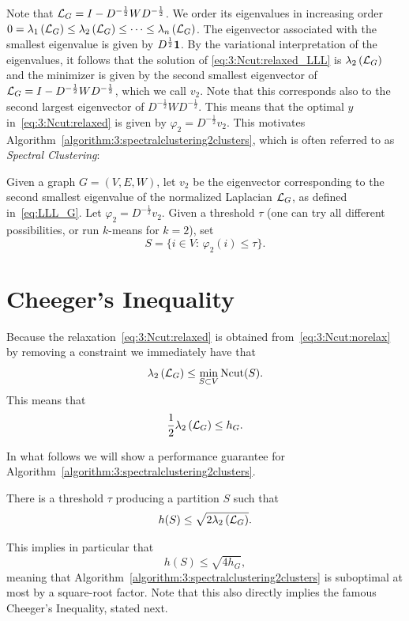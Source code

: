 Note that $\mathcal{L}_G = I - D^{-\frac12}WD^{-\frac12}$. We order its eigenvalues in increasing order $0=\lambda_1\left( \mathcal{L}_G\right) \leq \lambda_2\left( \mathcal{L}_G\right) \leq \cdots \leq  \lambda_n\left( \mathcal{L}_G\right)$. The eigenvector associated with the smallest eigenvalue is given by $D^{\frac12}\mathbf{1}$. By the variational interpretation of the eigenvalues, it follows that the solution of \eqref{eq:3:Ncut:relaxed_LLL} is $\lambda_2\left( \mathcal{L}_G\right)$ and the minimizer is given by the second smallest eigenvector of $\mathcal{L}_G = I - D^{-\frac12}WD^{-\frac12}$, which we call $v_2$. Note that this corresponds also to the second largest eigenvector of $D^{-\frac12}WD^{-\frac12}$. This means that the optimal $y$ in~\eqref{eq:3:Ncut:relaxed} is given by $\varphi_2 = D^{-\frac12}v_2$. This motivates Algorithm~\ref{algorithm:3:spectralclustering2clusters}, which is often referred to as {\em Spectral Clustering}:
\begin{algorithm}[h]
Given a graph $G=(V,E,W)$, let $v_2$ be the eigenvector corresponding to the second smallest eigenvalue of the normalized Laplacian $\mathcal{L}_G$, as defined in~\eqref{eq:LLL_G}. Let $\varphi_2 = D^{-\frac12}v_2$.
Given a threshold $\tau$ (one can try all different possibilities, or run $k$-means for $k=2$), set
\[
S = \{ i\in V:\, \varphi_2(i)\leq \tau \}.
\]
\caption{Spectral Clustering}
\label{algorithm:3:spectralclustering2clusters}
\end{algorithm}



\section{Cheeger's Inequality} 
Because the relaxation~\eqref{eq:3:Ncut:relaxed} is obtained from~\eqref{eq:3:Ncut:norelax} by removing a constraint we immediately have that
\[
\lambda_2\left(\mathcal{L}_G\right) \leq \min_{S\subset V} \operatorname{Ncut}(S).
\]
This means that
\[
\frac12\lambda_2\left(\mathcal{L}_G\right) \leq h_G.
\]

In what follows we will show a performance guarantee for Algorithm~\ref{algorithm:3:spectralclustering2clusters}.

\begin{lemma}\label{lemma:3:neededforCheeger}
There is a threshold $\tau$ producing a partition $S$ such that
\[
h(S) \leq \sqrt{2\lambda_2\left(\mathcal{L}_G\right)}.
\]
\end{lemma}

This implies in particular that
\[
h(S) \leq \sqrt{4h_G},
\]
meaning that Algorithm~\ref{algorithm:3:spectralclustering2clusters} is suboptimal at most by a square-root factor. Note that this also directly implies the famous Cheeger's Inequality, stated next. 

